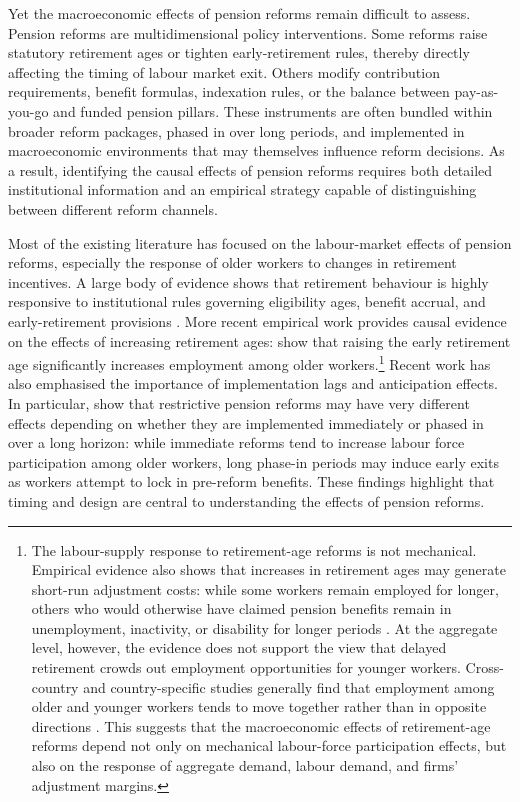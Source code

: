 \documentclass[11pt,english,a4paper, twoside, authoryear]{article}
\begin{document}
Yet the macroeconomic effects of pension reforms remain difficult to assess. Pension reforms are multidimensional policy interventions. Some reforms raise statutory retirement ages or tighten early-retirement rules, thereby directly affecting the timing of labour market exit. Others modify contribution requirements, benefit formulas, indexation rules, or the balance between pay-as-you-go and funded pension pillars. These instruments are often bundled within broader reform packages, phased in over long periods, and implemented in macroeconomic environments that may themselves influence reform decisions. As a result, identifying the causal effects of pension reforms requires both detailed institutional information and an empirical strategy capable of distinguishing between different reform channels.

Most of the existing literature has focused on the labour-market effects of pension reforms, especially the response of older workers to changes in retirement incentives. A large body of evidence shows that retirement behaviour is highly responsive to institutional rules governing eligibility ages, benefit accrual, and early-retirement provisions \citep{GruberWise1999}. More recent empirical work provides causal evidence on the effects of increasing retirement ages: \citet{StaubliZweimuller2013} show that raising the early retirement age significantly increases employment among older workers.\footnote{The labour-supply response to retirement-age reforms is not mechanical. Empirical evidence also shows that increases in retirement ages may generate short-run adjustment costs: while some workers remain employed for longer, others who would otherwise have claimed pension benefits remain in unemployment, inactivity, or disability for longer periods \citep{Rabate2020, Dubois2016, Leduigou2016}. At the aggregate level, however, the evidence does not support the view that delayed retirement crowds out employment opportunities for younger workers. Cross-country and country-specific studies generally find that employment among older and younger workers tends to move together rather than in opposite directions \citep{MunnellWu2012, Wise2017, Kalwij2010, BenSalem2010}. This suggests that the macroeconomic effects of retirement-age reforms depend not only on mechanical labour-force participation effects, but also on the response of aggregate demand, labour demand, and firms' adjustment margins.}
Recent work has also emphasised the importance of implementation lags and anticipation effects. In particular, \citet{BiZubairy2023} show that restrictive pension reforms may have very different effects depending on whether they are implemented immediately or phased in over a long horizon: while immediate reforms tend to increase labour force participation among older workers, long phase-in periods may induce early exits as workers attempt to lock in pre-reform benefits. These findings highlight that timing and design are central to understanding the effects of pension reforms.
\end{document}
